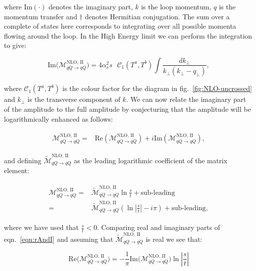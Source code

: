 	where $\text{Im}(\cdot)$ denotes the imaginary part, $k$ is the loop momentum, $q$ is the momentum
	transfer and $\dagger$ denotes Hermitian conjugation.  The sum over a complete of states here
	corresponds to integrating over all possible momenta flowing around the loop. In the High Energy
	limit we can perform the integration to give:

	\begin{equation}
		\text{Im}\Big(\mathcal{M}_{qQ\rightarrow qQ}^{\text{NLO, II}}\Big) =
		4\alpha_s^2 s\text{ }\mathcal{C}_1(T^a,T^b)
		\int \frac{dk_{\perp}}{k_{\perp}(k_{\perp} - q_{\perp})},
	\end{equation}

	where $\mathcal{C}_1(T^a,T^b)$ is the colour factor for the diagram in fig.~\eqref{fig:NLO-uncrossed}
	and $k_{\perp}$ is the transverse component of $k$.  We can now relate the
	imaginary part of the amplitude to the full amplitude by conjecturing that the amplitude will be
	logarithmically enhanced as follows:

	\begin{align}
	\begin{split}
		\mathcal{M}_{qQ\rightarrow qQ}^{\text{NLO, II}} =
		&\text{Re}(\mathcal{M}_{qQ\rightarrow qQ}^{\text{NLO, II}}) +
		i\text{Im}(\mathcal{M}_{qQ\rightarrow qQ}^{\text{NLO, II}}),
	\end{split}
	\end{align}

	and defining $\widetilde{\mathcal{M}}_{qQ\rightarrow qQ}^{\text{NLO, II}}$ as the leading
	logarithmic coefficient of the matrix element:

	\begin{align}
	\begin{split}
		\mathcal{M}_{qQ\rightarrow qQ}^{\text{NLO, II}} =&\widetilde{\mathcal{M}}_{qQ\rightarrow qQ}^{\text{NLO, II}}\ln\frac{s}{t} + \text{sub-leading}\\
		=&\widetilde{\mathcal{M}}_{qQ\rightarrow qQ}^{\text{NLO, II}}
		\left(\ln\left|\frac{s}{t}\right| -i\pi\right)+ \text{sub-leading},
		\label{eqn:rAndI}
	\end{split}
	\end{align}

	where we have used that $\frac{s}{t} < 0$.  Comparing real and imaginary parts of eqn.~\eqref{eqn:rAndI}
	and assuming that $\widetilde{\mathcal{M}}_{qQ\rightarrow qQ}^{\text{NLO, II}}$ is real we see that:

	\begin{equation}
		\text{Re}\Big(\mathcal{M}_{qQ\rightarrow qQ}^{\text{NLO, II}}\Big) =
		-\frac{1}{\pi}\text{Im}\Big(\mathcal{M}_{qQ\rightarrow qQ}^{\text{NLO, II}}\Big)\ln\left|\frac{s}{t}\right|
	\end{equation}

